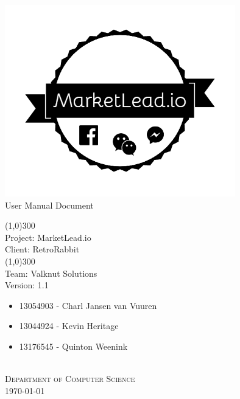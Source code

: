 \documentclass{article}
\begin{document}
	\begin{titlepage}
		\begin{center}
			\includegraphics[width=10cm]{images/logo.png}  \\%
			[0.5cm]
			\huge{
			User Manual Document\\
			}
			
			\line(1,0){300}\\
			[0.2cm]
			\LARGE{Project: MarketLead.io\\
			Client: RetroRabbit} \\
			\line(1,0){300}\\
			\LARGE{Team: Valknut Solutions}\\
			[1.0cm]
			\large{Version: 1.1}\\
			[1.0cm]
			\large
			{
			\begin{itemize}
				\item 13054903 - Charl Jansen van Vuuren    
				\item 13044924 - Kevin Heritage
				\item 13176545 - Quinton Weenink\\
			\end{itemize}
			}
			\textsc{\large}\\
		[3.0cm]
		\textsc{\large  Department of Computer Science}\\
		[0.5cm]
		\textsc{\large \today}\\
		\end{center}
	\end{titlepage}
	
	\cleardoublepage
	\begin{versionhistory}
	\end{versionhistory}	
	
\end{document}

